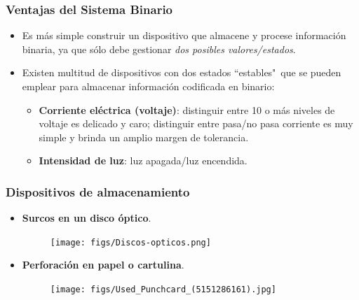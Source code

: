 \documentclass[aspectratio=169]{beamer}
\begin{document}
\begin{frame}[fragile]\frametitle{Ventajas del Sistema Binario}
\begin{itemize}
	\item Es más simple construir un dispositivo que almacene y procese información binaria, ya que sólo debe gestionar \emph{dos posibles valores/estados}.

\item Existen multitud de dispositivos con dos estados ``estables"\, que se pueden emplear para almacenar información codificada en binario:
\begin{itemize}
	\item \textbf{Corriente eléctrica (voltaje)}: distinguir entre 10 o más niveles de voltaje es delicado y caro; distinguir entre pasa/no pasa corriente es muy simple y brinda un amplio margen de tolerancia.
	\item \textbf{Intensidad de luz}: luz apagada/luz encendida.
\end{itemize}
\end{itemize}
\end{frame}
\begin{frame}[fragile]\frametitle{Dispositivos de almacenamiento}
\begin{itemize}
	\item \textbf{Surcos en un disco óptico}.
	\begin{figure}
	\begin{center}
	\texttt{[image: figs/Discos-opticos.png]}\hspace{1cm}	
	\end{center}
	\end{figure}
	\item \textbf{Perforación en papel o cartulina}.
	\begin{figure}
	\begin{center}
	\texttt{[image: figs/Used\_Punchcard\_(5151286161).jpg]}\hspace{1cm}	
	\end{center}
	\end{figure}
\end{itemize}
\end{frame}
\end{document}
